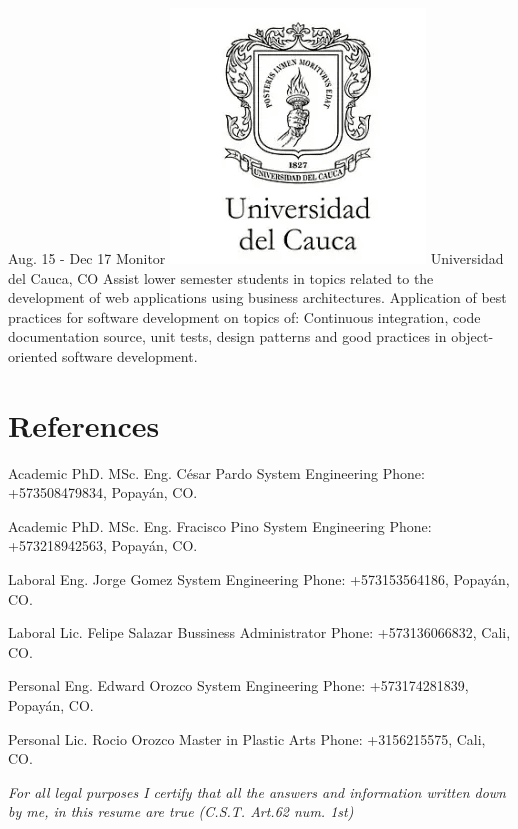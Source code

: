 \documentclass[american]{cv-class}
\begin{document}
\begin{entrylist}
	\entry
	{Aug. 15 - Dec 17}
	{Monitor}
	{{\includegraphics[scale=0.05]{img/unicauca-logo.png}} Universidad del Cauca, CO} 
	{Assist lower semester students in topics related to the development of web applications using business architectures. Application of best practices for software development on topics of: Continuous integration, code documentation source, unit tests, design patterns and good practices in object-oriented software development.}
	
\end{entrylist}


\section{References}
\begin{entrylist}
	  
	\entry
	{Academic}
	{PhD. MSc. Eng. César Pardo}
	{System Engineering} 
	{Phone: +573508479834, Popayán, CO.}
	
	\entry
	{Academic}
	{PhD. MSc. Eng. Fracisco Pino}
	{System Engineering} 
	{Phone: +573218942563, Popayán, CO.}
	
	\entry
	{Laboral}
	{Eng. Jorge Gomez}
	{System Engineering} 
	{Phone: +573153564186, Popayán, CO.}
	
	\entry
	{Laboral}
	{Lic. Felipe Salazar}
	{Bussiness Administrator} 
	{Phone: +573136066832, Cali, CO.}
	
	\entry
	{Personal}
	{Eng. Edward Orozco}
	{System Engineering} 
	{Phone: +573174281839, Popayán, CO.}
	
	\entry
	{Personal}
	{Lic. Rocio Orozco}
	{Master in Plastic Arts} 
	{Phone: +3156215575, Cali, CO.}
	
\end{entrylist}

\vspace{0.5cm}
\begin{center}
	\emph{For all legal purposes I certify that all
		the answers and information written down by me,
		in this resume are true (C.S.T.
	Art.62 num. 1st)}
\end{center}
\end{document}
